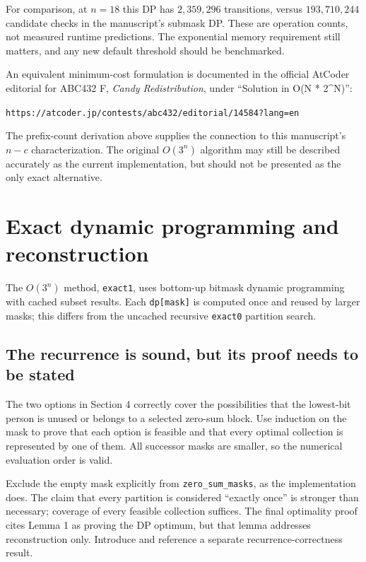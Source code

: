 \documentclass[11pt]{article}
\begin{document}
For comparison, at $n=18$ this DP has $2{,}359{,}296$ transitions,
versus $193{,}710{,}244$ candidate checks in the manuscript's submask
DP. These are operation counts, not measured runtime predictions.
The exponential memory requirement still matters, and any new default
threshold should be benchmarked.

An equivalent minimum-cost formulation is documented in the official
AtCoder editorial for ABC432 F, \emph{Candy Redistribution}, under
``Solution in O(N * 2\^{}N)'':
\begin{center}
\texttt{https://atcoder.jp/contests/abc432/editorial/14584?lang=en}
\end{center}
The prefix-count derivation above supplies the connection to this
manuscript's $n-c$ characterization. The original $O(3^n)$ algorithm
may still be described accurately as the current implementation, but
should not be presented as the only exact alternative.

\section{Exact dynamic programming and reconstruction}

The $O(3^n)$ method, \texttt{exact1}, uses bottom-up bitmask dynamic
programming with cached subset results. Each \texttt{dp[mask]} is computed
once and reused by larger masks; this differs from the uncached recursive
\texttt{exact0} partition search.

\subsection{The recurrence is sound, but its proof needs to be stated}

The two options in Section 4 correctly cover the possibilities that the
lowest-bit person is unused or belongs to a selected zero-sum block.
Use induction on the mask to prove that each option is feasible and that
every optimal collection is represented by one of them. All successor
masks are smaller, so the numerical evaluation order is valid.

Exclude the empty mask explicitly from \texttt{zero\_sum\_masks}, as the
implementation does. The claim that every partition is considered
``exactly once'' is stronger than necessary; coverage of every feasible
collection suffices. The final optimality proof cites Lemma 1 as proving
the DP optimum, but that lemma addresses reconstruction only. Introduce
and reference a separate recurrence-correctness result.
\end{document}

